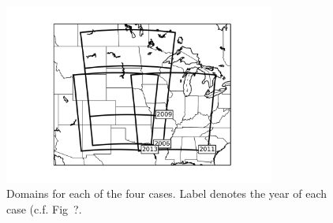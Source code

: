 \documentclass{ametsoc}
\begin{document}
{\begin{figure}[tbph]
\centering
\includegraphics[width=21pc]{images/domains}
\caption{Domains for each of the four cases. Label denotes the year of each case (c.f. Fig~?.}
\label{fig:domains}
\end{figure}

}
\end{document}

